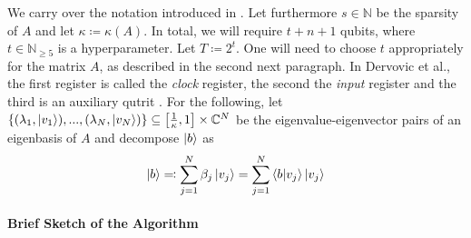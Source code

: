 We carry over the notation introduced in . Let furthermore \(s \in \mathbb{N}\) be the sparsity of \(A\) and let \(\kappa \coloneqq \kappa(A)\). In total, we will require \(t+n+1\) qubits, where \(t \in \mathbb{N}_{\geq 5}\) is a hyperparameter. Let \(T \coloneqq 2^t\). One will need to choose \(t\) appropriately for the matrix \(A\), as described in the second next paragraph. In Dervovic et al., the first register is called the \emph{clock} register, the second the \emph{input} register and the third is an auxiliary qutrit \cite[p. 30]{Dervovic2018}. For the following, let \(\{(\lambda_1, \ket{v_1}), ..., (\lambda_N, \ket{v_N})\} \subseteq \left[\frac{1}{\kappa}, 1\right] \times \mathbb{C}^N\) be the eigenvalue-eigenvector pairs of an eigenbasis of \(A\) and decompose \(\ket{b}\) as
\begin{align}
    \ket{b} \eqqcolon \sum_{j=1}^N \beta_j \ket{v_j} = \sum_{j=1}^N \braket{b}{v_j} \ket{v_j}
\end{align}

\paragraph*{Brief Sketch of the Algorithm} \phantom{}\\\phantom{}

